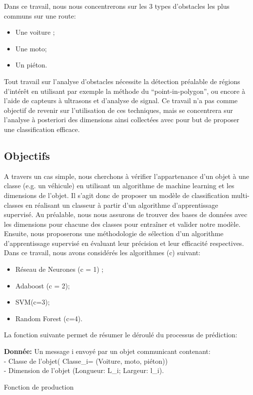 \documentclass[a4paper]{report}
\begin{document}
Dans ce travail, nous nous concentrerons sur les 3 types d’obstacles les plus communs sur une route:
\begin{itemize}
\item Une voiture ;
\item Une moto;
\item Un piéton.

\end{itemize}

Tout travail sur l’analyse d’obstacles nécessite la détection préalable de régions d’intérêt en utilisant par exemple la méthode du “point-in-polygon”\cite{ref1}, ou encore à l’aide de capteurs à ultrasons et d’analyse de signal\cite{ref2}. Ce travail n’a pas comme objectif de revenir sur l’utilisation de ces techniques, mais se concentrera sur l’analyse à posteriori des dimensions ainsi collectées avec pour but de proposer une classification efficace. 

\subsection*{Objectifs}
A travers un cas simple, nous cherchons à vérifier l’appartenance d’un objet à une classe (e.g. un véhicule) en utilisant un algorithme de machine learning et les dimensions de l’objet. Il s’agit donc de proposer un modèle de classification multi-classes en réalisant un classeur à partir d’un algorithme d’apprentissage supervisé. 
Au préalable, nous nous assurons de trouver des bases de données avec les dimensions pour chacune des classes pour entraîner et valider notre modèle. 
Ensuite, nous proposerons une méthodologie de sélection d’un algorithme d’apprentissage supervisé en évaluant leur précision et leur efficacité respectives. Dans ce travail, nous avons considérés les algorithmes (c) suivant: 
\begin{itemize}
\item Réseau de Neurones (c = 1) ;
\item Adaboost (c = 2);
\item SVM(c=3);
\item Random Forest (c=4).
\end{itemize}
\medbreak

La fonction suivante permet de résumer le déroulé du processus de prédiction:\\

\begin{algorithm}[H]
\SetAlgoLined
\textbf{Donnée:} Un message i envoyé par un objet communicant contenant:\\
- Classe de l'objet( Classe_{i}= (Voiture, moto, piéton))\\
- Dimension de l’objet (Longueur: L_{i}; Largeur: l_{i}). 
\bigbreak

\medbreak
{}
\caption{Fonction de production}
\end{algorithm}
\medbreak
\end{document}
